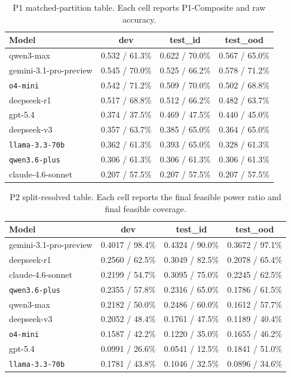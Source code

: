 \begin{table}[t]
\caption{P1 matched-partition table. Each cell reports P1-Composite and raw accuracy.}
\label{tab:appendix_p1_split}
\centering
\scriptsize
\setlength{\tabcolsep}{4pt}
\renewcommand{\arraystretch}{1.08}
\begin{tabular}{lccc}
\toprule
Model & dev & test\_id & test\_ood \\
\midrule
qwen3-max & 0.532 / 61.3\% & 0.622 / 70.0\% & 0.567 / 65.0\% \\
gemini-3.1-pro-preview & 0.545 / 70.0\% & 0.525 / 66.2\% & 0.578 / 71.2\% \\
\texttt{o4-mini} & 0.542 / 71.2\% & 0.509 / 70.0\% & 0.502 / 68.8\% \\
deepseek-r1 & 0.517 / 68.8\% & 0.512 / 66.2\% & 0.482 / 63.7\% \\
gpt-5.4 & 0.374 / 37.5\% & 0.469 / 47.5\% & 0.440 / 45.0\% \\
deepseek-v3 & 0.357 / 63.7\% & 0.385 / 65.0\% & 0.364 / 65.0\% \\
\texttt{llama-3.3-70b} & 0.362 / 61.3\% & 0.393 / 65.0\% & 0.328 / 61.3\% \\
\texttt{qwen3.6-plus} & 0.306 / 61.3\% & 0.306 / 61.3\% & 0.306 / 61.3\% \\
claude-4.6-sonnet & 0.207 / 57.5\% & 0.207 / 57.5\% & 0.207 / 57.5\% \\
\bottomrule
\end{tabular}
\end{table}

\begin{table}[t]
\caption{P2 split-resolved table. Each cell reports the final feasible power ratio and final feasible coverage.}
\label{tab:appendix_p2_split}
\centering
\scriptsize
\setlength{\tabcolsep}{4pt}
\renewcommand{\arraystretch}{1.08}
\begin{tabular}{lccc}
\toprule
Model & dev & test\_id & test\_ood \\
\midrule
gemini-3.1-pro-preview & 0.4017 / 98.4\% & 0.4324 / 90.0\% & 0.3672 / 97.1\% \\
deepseek-r1 & 0.2560 / 62.5\% & 0.3049 / 82.5\% & 0.2078 / 65.4\% \\
claude-4.6-sonnet & 0.2199 / 54.7\% & 0.3095 / 75.0\% & 0.2245 / 62.5\% \\
\texttt{qwen3.6-plus} & 0.2355 / 57.8\% & 0.2316 / 65.0\% & 0.1786 / 61.5\% \\
qwen3-max & 0.2182 / 50.0\% & 0.2486 / 60.0\% & 0.1612 / 57.7\% \\
deepseek-v3 & 0.2052 / 48.4\% & 0.1761 / 47.5\% & 0.1189 / 40.4\% \\
\texttt{o4-mini} & 0.1587 / 42.2\% & 0.1220 / 35.0\% & 0.1655 / 46.2\% \\
gpt-5.4 & 0.0991 / 26.6\% & 0.0541 / 12.5\% & 0.1841 / 51.0\% \\
\texttt{llama-3.3-70b} & 0.1781 / 43.8\% & 0.1046 / 32.5\% & 0.0896 / 34.6\% \\
\bottomrule
\end{tabular}
\end{table}

